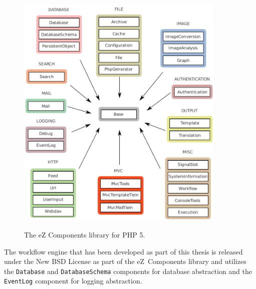 \begin{figure}[hbt]
\begin{center}
\includegraphics[width=10cm]{figures/ezcomponents}\\[5mm]
\end{center}
\caption{The eZ Components library for PHP 5.}
\label{figure-eZComponents}
\end{figure}

The workflow engine that has been developed as part of this thesis is
released under the New BSD License as part of the eZ~Components library and
utilizes the \texttt{Database} and \texttt{DatabaseSchema} components for
database abstraction and the \texttt{EventLog} component for logging
abstraction.
